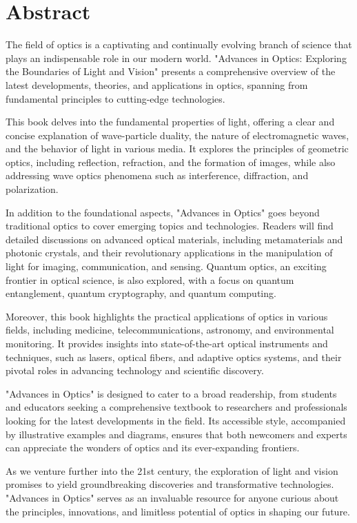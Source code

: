 \section*{Abstract}

    The field of optics is a captivating and continually evolving branch of science that plays an indispensable role in our modern world. "Advances in Optics: Exploring the Boundaries of Light and Vision" presents a comprehensive overview of the latest developments, theories, and applications in optics, spanning from fundamental principles to cutting-edge technologies.

    This book delves into the fundamental properties of light, offering a clear and concise explanation of wave-particle duality, the nature of electromagnetic waves, and the behavior of light in various media. It explores the principles of geometric optics, including reflection, refraction, and the formation of images, while also addressing wave optics phenomena such as interference, diffraction, and polarization.
    
    In addition to the foundational aspects, "Advances in Optics" goes beyond traditional optics to cover emerging topics and technologies. Readers will find detailed discussions on advanced optical materials, including metamaterials and photonic crystals, and their revolutionary applications in the manipulation of light for imaging, communication, and sensing. Quantum optics, an exciting frontier in optical science, is also explored, with a focus on quantum entanglement, quantum cryptography, and quantum computing.
    
    Moreover, this book highlights the practical applications of optics in various fields, including medicine, telecommunications, astronomy, and environmental monitoring. It provides insights into state-of-the-art optical instruments and techniques, such as lasers, optical fibers, and adaptive optics systems, and their pivotal roles in advancing technology and scientific discovery.
    
    "Advances in Optics" is designed to cater to a broad readership, from students and educators seeking a comprehensive textbook to researchers and professionals looking for the latest developments in the field. Its accessible style, accompanied by illustrative examples and diagrams, ensures that both newcomers and experts can appreciate the wonders of optics and its ever-expanding frontiers.
    
    As we venture further into the 21st century, the exploration of light and vision promises to yield groundbreaking discoveries and transformative technologies. "Advances in Optics" serves as an invaluable resource for anyone curious about the principles, innovations, and limitless potential of optics in shaping our future.